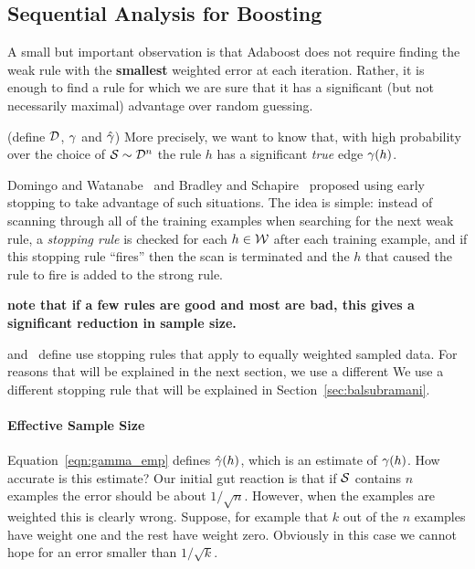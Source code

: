 \subsection{Sequential Analysis for Boosting}\label{sec:methods:early-stop}

A small but important observation is that Adaboost does not require
finding the weak rule with the {\bf smallest} weighted error at each
iteration. Rather, it is enough to find a rule for which we are sure
that it has a significant (but not necessarily maximal) advantage over
random guessing.

(define ${\cal D}$, $\gamma$ and $\hat{\gamma}$)
More precisely, we want to know that, with high
probability over the choice of ${\cal S} \sim {\cal D}^n$ the rule $h$
has a significant {\em true} edge $\gamma(h)$.

Domingo and Watanabe~\cite{domingo_scaling_2000} and Bradley and
Schapire~\cite{bradley_filterboost:_2007} proposed using early
stopping to take advantage of such situations. The idea is simple:
instead of scanning through all of the training examples when
searching for the next weak rule, a {\em stopping rule} is checked for
each $h \in \mathcal{W}$ after each training example, and if this stopping
rule ``fires'' then the scan is terminated and the $h$ that caused the
rule to fire is added to the strong rule.

{\bf note that if a few rules are good and most are bad, this gives a
  significant reduction in sample size.}

\cite{bradley_filterboost:_2007} and~\cite{domingo_scaling_2000}
define use stopping rules that apply to equally weighted sampled
data. For reasons that will be explained in the next section, we use a different
 We use a different stopping rule that will be explained in
 Section~\ref{sec:balsubramani}.


\paragraph{Effective Sample Size}
\label{sec:effectiveSampleSize}
Equation~\ref{eqn:gamma_emp} defines $\hat{\gamma}(h)$, which is an
estimate of $\gamma(h)$. How accurate is this estimate? Our initial
gut reaction is that if ${\cal S}$ contains $n$ examples the error should be
about $1/\sqrt{n}$. However, when the examples are weighted this is
clearly wrong. Suppose, for example that $k$ out of the $n$ examples
have weight one and the rest have weight zero. Obviously in this case
we cannot hope for an error smaller than $1/\sqrt{k}$.

